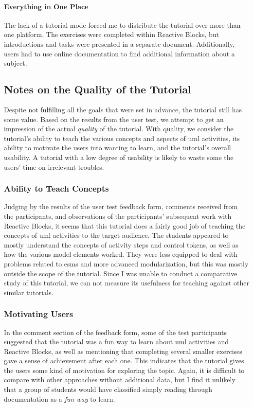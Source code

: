 \paragraph{Everything in One Place} The lack of a tutorial mode forced me to distribute the tutorial over more than one platform. The exercises were completed within Reactive Blocks, but introductions and tasks were presented in a separate document. Additionally, users had to use online documentation to find additional information about a subject.

\subsection{Notes on the Quality of the Tutorial}
\label{sec:tutorial_quality}
Despite not fulfilling all the goals that were set in advance, the tutorial still has some value. Based on the results from the user test, we attempt to get an impression of the actual \emph{quality} of the tutorial. With quality, we consider the tutorial's ability to teach the various concepts and aspects of \gls{uml} activities, its ability to motivate the users into wanting to learn, and the tutorial's overall usability. A tutorial with a low degree of usability is likely to waste some the users' time on irrelevant troubles.

\subsubsection{Ability to Teach Concepts}
Judging by the results of the user test feedback form, comments received from the participants, and observations of the participants' subsequent work with Reactive Blocks, it seems that this tutorial does a fairly good job of teaching the concepts of \gls{uml} activities to the target audience. The students appeared to mostly understand the concepts of activity steps and control tokens, as well as how the various model elements worked. They were less equipped to deal with problems related to \glspl{esm} and more advanced modularization, but this was mostly outside the scope of the tutorial. Since I was unable to conduct a comparative study of this tutorial, we can not measure its usefulness for teaching against other similar tutorials.

\subsubsection{Motivating Users}
In the comment section of the feedback form, some of the test participants suggested that the tutorial was a fun way to learn about \gls{uml} activities and Reactive Blocks, as well as mentioning that completing several smaller exercises gave a sense of achievement after each one. This indicates that the tutorial gives the users some kind of motivation for exploring the topic. Again, it is difficult to compare with other approaches without additional data, but I find it unlikely that a group of students would have classified simply reading through documentation as a \emph{fun way} to learn.

